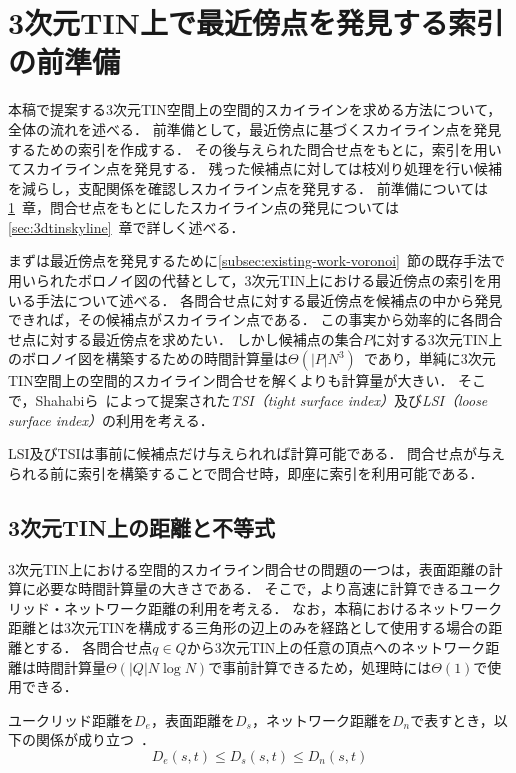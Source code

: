 \documentclass{fit}
\theoremstyle{definition}
\newcommand{\Sec}[1]{#1~章}
\newcommand{\Subsec}[1]{#1~節}
\begin{document}
\section{3次元TIN上で最近傍点を発見する索引の前準備}\label{sec:tsilsi}

本稿で提案する3次元TIN空間上の空間的スカイラインを求める方法について，全体の流れを述べる．
前準備として，最近傍点に基づくスカイライン点を発見するための索引を作成する．
その後与えられた問合せ点をもとに，索引を用いてスカイライン点を発見する．
残った候補点に対しては枝刈り処理を行い候補を減らし，支配関係を確認しスカイライン点を発見する．
前準備については\Sec{\ref{sec:tsilsi}}，問合せ点をもとにしたスカイライン点の発見については\Sec{\ref{sec:3dtinskyline}}で詳しく述べる．

まずは最近傍点を発見するために\Subsec{\ref{subsec:existing-work-voronoi}}の既存手法で用いられたボロノイ図の代替として，3次元TIN上における最近傍点の索引を用いる手法について述べる．
各問合せ点に対する最近傍点を候補点の中から発見できれば，その候補点がスカイライン点である．
この事実から効率的に各問合せ点に対する最近傍点を求めたい．
しかし候補点の集合$P$に対する3次元TIN上のボロノイ図を構築するための時間計算量は$\Theta(|P|N^3)$~\cite{scg:chen1990}であり，単純に3次元TIN空間上の空間的スカイライン問合せを解くよりも計算量が大きい．
そこで，Shahabiら~\cite{vldb:shahabi2008}によって提案された\emph{TSI（tight surface index）}及び\emph{LSI（loose surface index）}の利用を考える．

LSI及びTSIは事前に候補点だけ与えられれば計算可能である．
問合せ点が与えられる前に索引を構築することで問合せ時，即座に索引を利用可能である．

\subsection{3次元TIN上の距離と不等式}
3次元TIN上における空間的スカイライン問合せの問題の一つは，表面距離の計算に必要な時間計算量の大きさである．
そこで，より高速に計算できるユークリッド・ネットワーク距離の利用を考える．
なお，本稿におけるネットワーク距離とは3次元TINを構成する三角形の辺上のみを経路として使用する場合の距離とする．
各問合せ点$q \in Q$から3次元TIN上の任意の頂点へのネットワーク距離は時間計算量$\Theta(|Q|N \log N)$で事前計算できるため，処理時には$\Theta(1)$で使用できる．

ユークリッド距離を$D_e$，表面距離を$D_s$，ネットワーク距離を$D_n$で表すとき，以下の関係が成り立つ~\cite{vldb:shahabi2008}．
\begin{equation}
  \label{eq:base:tin_inequality}
  D_{e}(s,t) \leq D_{s}(s,t) \leq D_{n}(s,t)
\end{equation}
\end{document}
